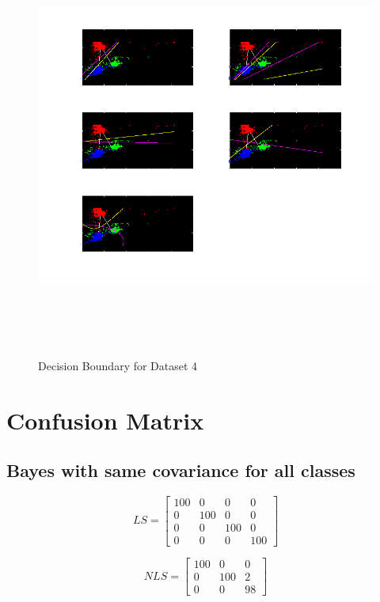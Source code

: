 \documentclass[11pt,a4paper]{article}
\begin{document}
\begin{figure}[H]
	\includegraphics[height=14cm]{Figures/RWD_DB.png}
	\caption{Decision Boundary for Dataset 4}
\end{figure}


\clearpage
\section{Confusion Matrix}

\subsection{Bayes with same covariance for all classes}
$$LS = 
\begin{bmatrix}
100   &  0 &    0 &    0 \\
0  & 100   &  0   &  0 \\
0   &  0 &  100  &   0 \\
0   &  0 &    0 &  100
\end{bmatrix}
$$

$$
NLS = \begin{bmatrix}
100  &   0 &   0  \\
0 &  100  &  2 \\
0   &  0   & 98  
\end{bmatrix}
$$
\end{document}
